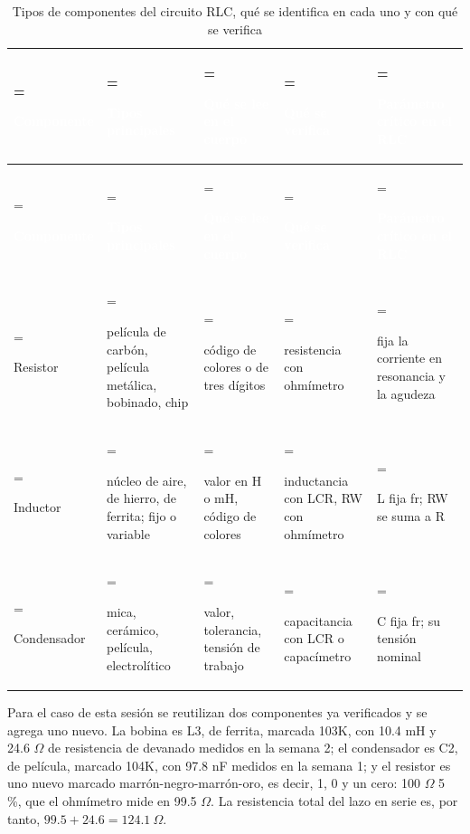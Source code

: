 \documentclass[11pt,letterpaper]{article}
\begin{document}
\begin{xltabular}{\linewidth}{>{\hsize\linewidth=\hsize\raggedright\arraybackslash}X>{\hsize\linewidth=\hsize\raggedright\arraybackslash}X>{\hsize\linewidth=\hsize\raggedright\arraybackslash}X>{\hsize\linewidth=\hsize\raggedright\arraybackslash}X>{\hsize\linewidth=\hsize\raggedright\arraybackslash}X}
\caption{Tipos de componentes del circuito RLC, qué se identifica en cada uno y con qué se verifica} \\
 \textcolor{white}{\textbf{Componente}} & \textcolor{white}{\textbf{Tipos principales}} & \textcolor{white}{\textbf{Qué se lee en el cuerpo}} & \textcolor{white}{\textbf{Qué se verifica}} & \textcolor{white}{\textbf{Parámetro crítico en el RLC}} \\
\endfirsthead
{} \textcolor{white}{\textbf{Componente}} & \textcolor{white}{\textbf{Tipos principales}} & \textcolor{white}{\textbf{Qué se lee en el cuerpo}} & \textcolor{white}{\textbf{Qué se verifica}} & \textcolor{white}{\textbf{Parámetro crítico en el RLC}} \\
\endhead
\bottomrule
\endlastfoot
  Resistor & película de carbón, película metálica, bobinado, chip & código de colores o de tres dígitos & resistencia con ohmímetro & fija la corriente en resonancia y la agudeza \\
   Inductor & núcleo de aire, de hierro, de ferrita; fijo o variable & valor en \textmu{}H o mH, código de colores & inductancia con LCR, RW con ohmímetro & L fija fr; RW se suma a R \\
  Condensador & mica, cerámico, película, electrolítico & valor, tolerancia, tensión de trabajo & capacitancia con LCR o capacímetro & C fija fr; su tensión nominal \\
\end{xltabular}

Para el caso de esta sesión se reutilizan dos componentes ya verificados y se agrega uno nuevo. La bobina es L3, de ferrita, marcada 103K, con 10.4 mH y 24.6 \ensuremath{\Omega} de resistencia de devanado medidos en la semana 2; el condensador es C2, de película, marcado 104K, con 97.8 nF medidos en la semana 1; y el resistor es uno nuevo marcado marrón-negro-marrón-oro, es decir, 1, 0 y un cero: 100 \ensuremath{\Omega} \textpm{}5 \%, que el ohmímetro mide en 99.5 \ensuremath{\Omega}. La resistencia total del lazo en serie es, por tanto, $99.5 + 24.6 = 124.1\ \Omega$.
\end{document}
